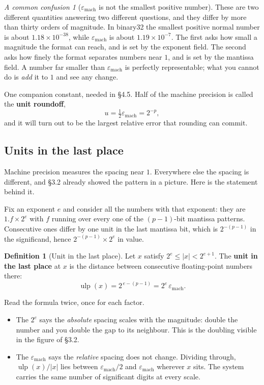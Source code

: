 \documentclass[11pt]{article}
\theoremstyle{plain}
\theoremstyle{definition}
\newtheorem{defn}{Definition}[section]
\theoremstyle{remark}
\newtheorem*{warn}{A common confusion}
\newcommand{\epsm}{\varepsilon_{\mathrm{mach}}}
\begin{document}
\begin{warn}[$\epsm$ is not the smallest positive number]
These are two different quantities answering two different questions, and they
differ by more than thirty orders of magnitude. In binary32 the smallest
positive normal number is about $1.18\times10^{-38}$, while
$\epsm$ is about $1.19\times10^{-7}$. The first asks how
small a magnitude the format can reach, and is set by the exponent field. The
second asks how finely the format separates numbers near $1$, and is set by the
mantissa field. A number far smaller than $\epsm$ is
perfectly representable; what you cannot do is \emph{add} it to $1$ and see any
change.
\end{warn}

\noindent One companion constant, needed in \S4.5. Half of the machine precision
is called the \textbf{unit roundoff},
\[
  u = \tfrac12\epsm = 2^{-p},
\]
and it will turn out to be the largest relative error that rounding can commit.

\subsection{Units in the last place}
Machine precision measures the spacing near $1$. Everywhere else the spacing is
different, and \S3.2 already showed the pattern in a picture. Here is the
statement behind it.

Fix an exponent $e$ and consider all the numbers with that exponent: they are
$1.f\times2^{e}$ with $f$ running over every one of the $(p-1)$-bit mantissa
patterns. Consecutive ones differ by one unit in the last mantissa bit, which is
$2^{-(p-1)}$ in the significand, hence $2^{-(p-1)}\times2^{e}$ in value.

\begin{defn}[Unit in the last place]
Let $x$ satisfy $2^{e}\le|x|<2^{e+1}$. The \textbf{unit in the last place} at
$x$ is the distance between consecutive floating-point numbers there:
\[
  \operatorname{ulp}(x) = 2^{\,e-(p-1)} = 2^{e}\,\epsm .
\]
\end{defn}

\noindent Read the formula twice, once for each factor.

\begin{itemize}[leftmargin=1.4em,itemsep=4pt]
  \item The $2^{e}$ says the \emph{absolute} spacing scales with the magnitude:
        double the number and you double the gap to its neighbour. This is the
        doubling visible in the figure of \S3.2.
  \item The $\epsm$ says the \emph{relative} spacing does
        not change. Dividing through, $\operatorname{ulp}(x)/|x|$ lies between
        $\epsm/2$ and $\epsm$ wherever
        $x$ sits. The system carries the same number of significant digits at
        every scale.
\end{itemize}
\end{document}

